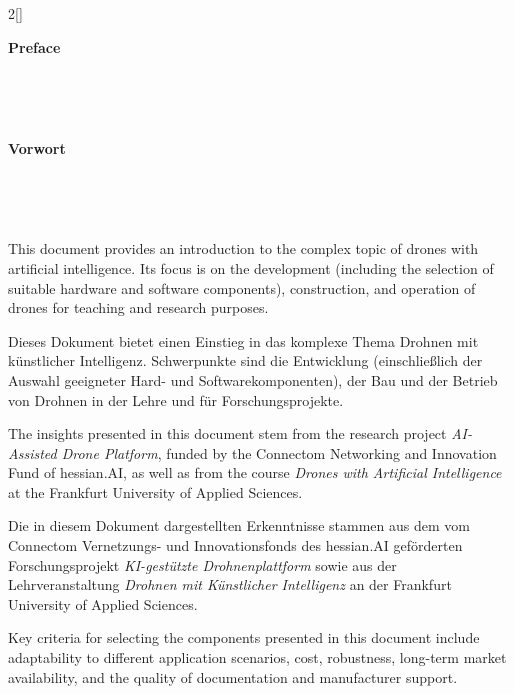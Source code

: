 \setcounter{page}{5}

\renewcommand{\deutschertitel}{Vorwort}
\renewcommand{\englischertitel}{Preface}

\chapter*{}

\begin{paracol}{2}[]

{\raggedright\huge\bfseries\sffamily \englischertitel \par\ } \\[1.8ex]

\switchcolumn

{\raggedright\huge\bfseries\sffamily \deutschertitel \par\ } \\[1.8ex]

\coleng

This document provides an introduction to the complex topic of drones with artificial intelligence. Its focus is on the development (including the selection of suitable hardware and software components), construction, and operation of drones for teaching and research purposes.

\colger

Dieses Dokument bietet einen Einstieg in das komplexe Thema Drohnen mit künstlicher Intelligenz. Schwerpunkte sind die Entwicklung (einschließlich der Auswahl geeigneter Hard- und Softwarekomponenten), der Bau und der Betrieb von Drohnen in der Lehre und für Forschungsprojekte.

\coleng

The insights presented in this document stem from the research project \textsl{AI-Assisted Drone Platform}, funded by the Connectom Networking and Innovation Fund of hessian.AI, as well as from the course \textsl{Drones with Artificial Intelligence} at the Frankfurt University of Applied Sciences.

\colger

Die in diesem Dokument dargestellten Erkenntnisse stammen aus dem vom Connectom Vernetzungs- und Innovationsfonds des hessian.AI geförderten Forschungsprojekt \textsl{KI-gestützte Drohnenplattform} sowie aus der Lehrveranstaltung \textsl{Drohnen mit Künstlicher Intelligenz} an der Frankfurt University of Applied Sciences.

\coleng

Key criteria for selecting the components presented in this document include adaptability to different application scenarios, cost, robustness, long-term market availability, and the quality of documentation and manufacturer support.


\end{paracol}
